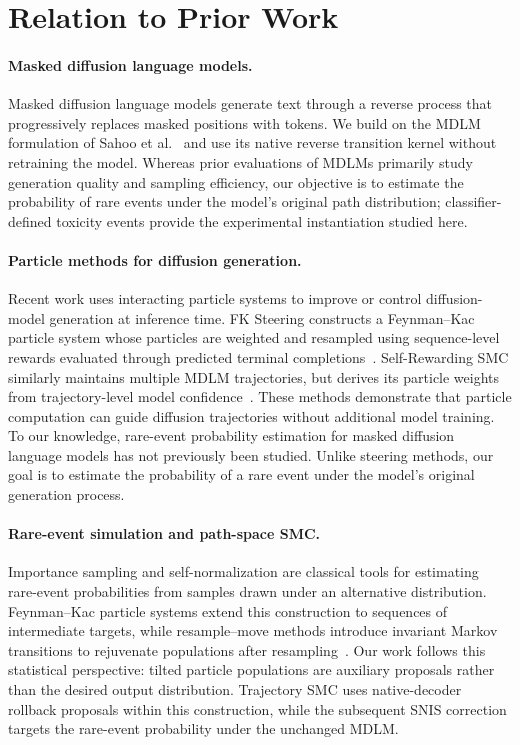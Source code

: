 \documentclass{article}
\begin{document}
\section{Relation to Prior Work}

\paragraph{Masked diffusion language models.}
Masked diffusion language models generate text through a reverse process that
progressively replaces masked positions with tokens. We build on the MDLM
formulation of Sahoo et al.~\citep{sahoo2024mdlm} and use its native reverse
transition kernel without retraining the model. Whereas prior evaluations of
MDLMs primarily study generation quality and sampling efficiency, our
objective is to estimate the probability of rare events under the model's
original path distribution; classifier-defined toxicity events provide the
experimental instantiation studied here.

\paragraph{Particle methods for diffusion generation.}
Recent work uses interacting particle systems to improve or control
diffusion-model generation at inference time. FK Steering constructs a
Feynman--Kac particle system whose particles are weighted and resampled using
sequence-level rewards evaluated through predicted terminal
completions~\citep{singhal2025fk}. Self-Rewarding SMC similarly maintains
multiple MDLM trajectories, but derives its particle weights from
trajectory-level model confidence~\citep{luo2026selfrewarding}. These methods
demonstrate that particle computation can guide diffusion trajectories without
additional model training. To our knowledge, rare-event probability estimation
for masked diffusion language models has not previously been studied. Unlike
steering methods, our goal is to estimate the probability of a rare event under
the model's original generation process.

\paragraph{Rare-event simulation and path-space SMC.}
Importance sampling and self-normalization are classical tools for estimating
rare-event probabilities from samples drawn under an alternative
distribution. Feynman--Kac particle systems extend this construction to
sequences of intermediate targets, while resample--move methods introduce
invariant Markov transitions to rejuvenate populations after
resampling~\citep{delmoral2004feynman,gilks2001resamplemove}. Our work follows
this statistical perspective: tilted particle populations are auxiliary
proposals rather than the desired output distribution. Trajectory SMC uses
native-decoder rollback proposals within this construction, while the
subsequent SNIS correction targets the rare-event probability under the
unchanged MDLM.
\end{document}
